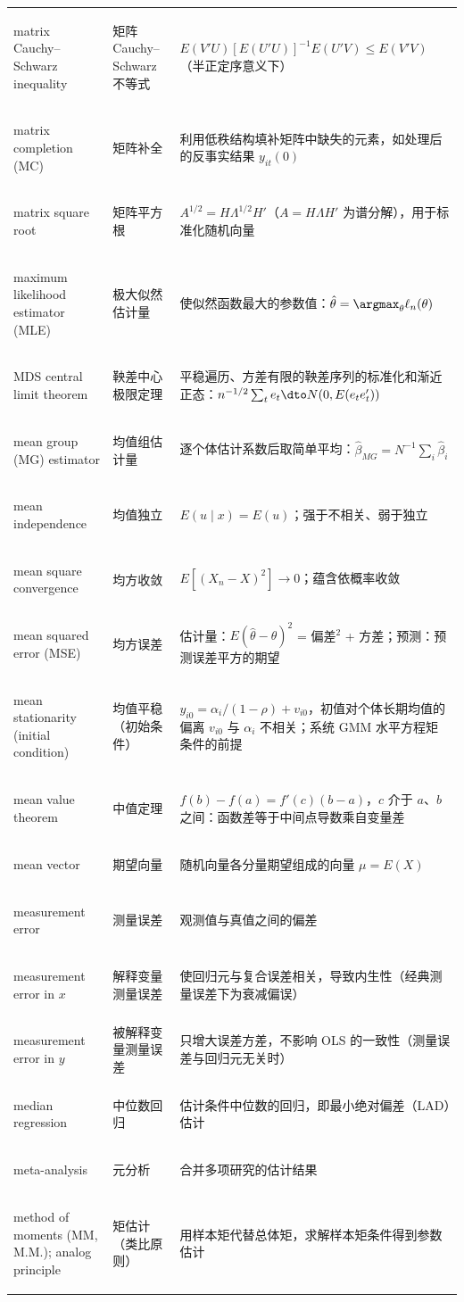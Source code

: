 \begin{longtable}{@{}>{\bfseries\boldmath\raggedright\arraybackslash}p{4.6cm}>{\raggedright\arraybackslash}p{3.2cm}>{\raggedright\arraybackslash}p{\dimexpr\textwidth-7.8cm-4\tabcolsep\relax}@{}}
matrix Cauchy--Schwarz inequality & 矩阵 Cauchy--Schwarz 不等式 & $E(V'U)[E(U'U)]^{-1}E(U'V)\le E(V'V)$（半正定序意义下） \\
matrix completion (MC) & 矩阵补全 & 利用低秩结构填补矩阵中缺失的元素，如处理后的反事实结果 $y_{it}(0)$ \\
matrix square root & 矩阵平方根 & $A^{1/2}=H\Lambda^{1/2}H'$（$A=H\Lambda H'$ 为谱分解），用于标准化随机向量 \\
maximum likelihood estimator (MLE) & 极大似然估计量 & 使似然函数最大的参数值：$\hat\theta=\argmax_\theta\ell_n(\theta)$ \\
MDS central limit theorem & 鞅差中心极限定理 & 平稳遍历、方差有限的鞅差序列的标准化和渐近正态：$n^{-1/2}\sum_te_t\dto N(0,E(e_te_t'))$ \\
mean group (MG) estimator & 均值组估计量 & 逐个体估计系数后取简单平均：$\hat\beta_{MG}=N^{-1}\sum_i\hat\beta_i$ \\
mean independence & 均值独立 & $E(u\mid x)=E(u)$；强于不相关、弱于独立 \\
mean square convergence & 均方收敛 & $E[(X_n-X)^2]\to0$；蕴含依概率收敛 \\
mean squared error (MSE) & 均方误差 & 估计量：$E(\hat\theta-\theta)^2$ = 偏差$^2$ + 方差；预测：预测误差平方的期望 \\
mean stationarity (initial condition) & 均值平稳（初始条件） & $y_{i0}=\alpha_i/(1-\rho)+v_{i0}$，初值对个体长期均值的偏离 $v_{i0}$ 与 $\alpha_i$ 不相关；系统 GMM 水平方程矩条件的前提 \\
mean value theorem & 中值定理 & $f(b)-f(a)=f'(c)(b-a)$，$c$ 介于 $a$、$b$ 之间：函数差等于中间点导数乘自变量差 \\
mean vector & 期望向量 & 随机向量各分量期望组成的向量 $\mu=E(X)$ \\
measurement error & 测量误差 & 观测值与真值之间的偏差 \\
measurement error in $x$ & 解释变量测量误差 & 使回归元与复合误差相关，导致内生性（经典测量误差下为衰减偏误） \\
measurement error in $y$ & 被解释变量测量误差 & 只增大误差方差，不影响 OLS 的一致性（测量误差与回归元无关时） \\
median regression & 中位数回归 & 估计条件中位数的回归，即最小绝对偏差（LAD）估计 \\
meta-analysis & 元分析 & 合并多项研究的估计结果 \\
method of moments (MM, M.M.); analog principle & 矩估计（类比原则） & 用样本矩代替总体矩，求解样本矩条件得到参数估计 \\

\end{longtable}
